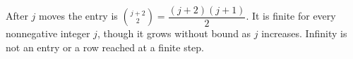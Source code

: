 After $ j $ moves the entry is $\binom{j+2}{2}=\boxed{\dfrac{(j+2)(j+1)}{2}}$. It is finite for every nonnegative integer $ j $, though it grows without bound as $ j $ increases. Infinity is not an entry or a row reached at a finite step.
